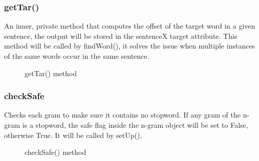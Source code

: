 \documentclass[12pt,oneside,openright,a4paper]{cpe-english-project}
\begin{document}
\subsubsection{getTar() }
An inner, private method that computes the offset of the target word in a given sentence, the output will be stored in the sentenceX target attribute. This method will be called by findWord(), it solves the issue when multiple instances of the same words occur in the same sentence.
\begin{figure}[!h]\centering
\setlength{\fboxrule}{0.2mm} %
\setlength{\fboxsep}{1cm}
\caption{getTar() method}\label{fig:getTar() method}
\end{figure}
\subsubsection{checkSafe}
Checks each gram to make sure it contains no stopword. If any gram of the n-gram is a stopword, the safe flag inside the n-gram object will be set to False, otherwise True. It will be called by setUp().
\begin{figure}[!h]\centering
\setlength{\fboxrule}{0.2mm} %
\setlength{\fboxsep}{1cm}
\caption{checkSafe() method}\label{fig:checkSafe() method}
\end{figure}
\end{document}
